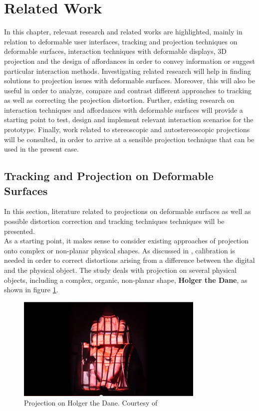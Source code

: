 \documentclass[]{article}
\begin{document}
\section{Related Work}

In this chapter, relevant research and related works are highlighted, mainly in relation to deformable user interfaces, tracking and projection techniques on deformable surfaces, interaction techniques with deformable displays, 3D projection and the design of affordances in order to convey information or suggest particular interaction methods. Investigating related research will help in finding solutions to projection issues with deformable surfaces. Moreover, this will also be useful in order to analyze, compare and contrast different approaches to tracking as well as correcting the projection distortion. Further, existing research on interaction techniques and affordances with deformable surfaces will provide a starting point to test, design and implement relevant interaction scenarios for the prototype. Finally, work related to stereoscopic and autostereoscopic projections will be consulted, in order to arrive at a sensible projection technique that can be used in the present case.

\subsection{Tracking and Projection on Deformable Surfaces}

In this section, literature related to projections on deformable surfaces as well as possible distortion correction and tracking techniques techniques will be presented.\\

As a starting point, it makes sense to consider existing approaches of projection onto complex or non-planar physical shapes. As discussed in \cite{daalsgard11}, calibration is needed in order to correct distortions arising from a difference between the digital and the physical object. The study deals with projection on several physical objects, including a complex, organic, non-planar shape, \textbf{Holger the Dane}, as shown in figure \ref{fig:holger}.

\begin{figure}[hbtp]
    \centering
    \includegraphics[width=0.8\textwidth]{figures/HolgerTheDane.PNG}
    \caption{Projection on Holger the Dane. Courtesy of \cite{daalsgard11}}
    \label{fig:holger}
\end{figure}
\end{document}
